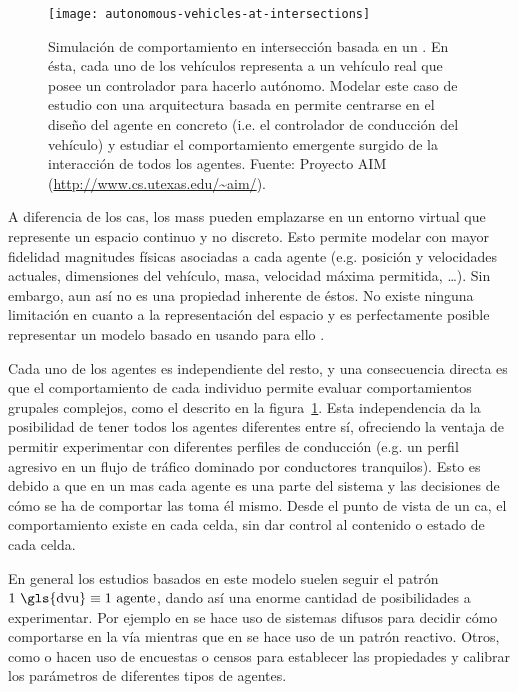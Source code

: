 \begin{figure}[t]
	\centering
	\texttt{[image: autonomous-vehicles-at-intersections]}
	\caption[Simulación de comportamiento en intersección basada en un \acrlong{mas}]{Simulación de comportamiento en intersección basada en un . En ésta, cada uno de los vehículos representa a un vehículo real que posee un controlador para hacerlo autónomo. Modelar este caso de estudio con una arquitectura basada en  permite centrarse en el diseño del agente en concreto (i.e. el controlador de conducción del vehículo) y estudiar el comportamiento emergente surgido de la interacción de todos los agentes. Fuente: Proyecto AIM (\url{http://www.cs.utexas.edu/~aim/}).}
	\label{fig:autonomous-vehicles-at-intersections}
\end{figure}

A diferencia de los \acp{ca}, los \acp{mas} pueden emplazarse en un entorno virtual que represente un espacio continuo y no discreto. Esto permite modelar con mayor fidelidad magnitudes físicas asociadas a cada agente (e.g. posición y velocidades actuales, dimensiones del vehículo, masa, velocidad máxima permitida, \ldots). Sin embargo, aun así no es una propiedad inherente de éstos. No existe ninguna limitación en cuanto a la representación del espacio y es perfectamente posible representar un modelo basado en  usando para ello .

Cada uno de los agentes es independiente del resto, y una consecuencia directa es que el comportamiento de cada individuo permite evaluar comportamientos grupales complejos, como el descrito en la figura~\ref{fig:autonomous-vehicles-at-intersections}. Esta independencia da la posibilidad de tener todos los agentes diferentes entre sí, ofreciendo la ventaja de permitir experimentar con diferentes perfiles de conducción (e.g. un perfil agresivo en un flujo de tráfico dominado por conductores tranquilos). Esto es debido a que en un \ac{mas} cada agente es una parte del sistema y las decisiones de cómo se ha de comportar las toma él mismo. Desde el punto de vista de un \ac{ca}, el comportamiento existe en cada celda, sin dar control al contenido o estado de cada celda.

En general los estudios basados en este modelo suelen seguir el patrón $1 \text{ \gls{dvu}} \equiv 1 \text{ agente}$, dando así una enorme cantidad de posibilidades a experimentar. Por ejemplo en \cite{Das} se hace uso de sistemas difusos para decidir cómo comportarse en la vía mientras que en \cite{Ehlert2001} se hace uso de un patrón reactivo. Otros, como \cite{Dia2002} o \cite{Balmer} hacen uso de encuestas o censos para establecer las propiedades y calibrar los parámetros de diferentes tipos de agentes.

